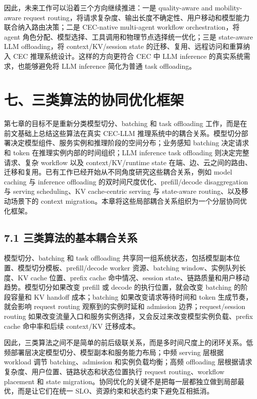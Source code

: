 \documentclass[a4paper,10pt]{ctexart}
\begin{document}
因此，未来工作可以沿着三个方向继续推进：一是 quality-aware and mobility-aware request routing，将请求复杂度、输出长度不确定性、用户移动和模型能力联合纳入路由决策；二是 CEC-native multi-agent workflow orchestration，将 agent 角色分配、模型选择、工具调用和物理节点选择统一优化；三是 state-aware LLM offloading，将 context/KV/session state 的迁移、复用、远程访问和重算纳入 CEC 推理系统设计。这样的方向更符合 CEC 中 LLM inference 的真实系统需求，也能够避免将 LLM inference 简化为普通 task offloading。




\section*{七、三类算法的协同优化框架}

第七章的目标不是重新分类模型切分、batching 和 task offloading 工作，而是在前文基础上总结这些算法在真实 CEC-LLM 推理系统中的耦合关系。模型切分部署决定模型组件、服务实例和推理阶段的空间分布；业务感知 batching 决定请求和 token 在推理实例内部的时间组织；LLM inference task offloading 则决定完整请求、复杂 workflow 以及 context/KV/runtime state 在端、边、云之间的路由、迁移和复用。已有工作已经开始从不同角度研究这些耦合关系，例如 model caching 与 inference offloading 的双时间尺度优化、prefill/decode disaggregation 与 serving scheduling、KV cache-centric serving 与 state-aware routing、以及移动场景下的 context migration。本章将这些局部耦合关系组织为一个分层协同优化框架。


\subsection*{7.1 三类算法的基本耦合关系}

模型切分、batching 和 task offloading 共享同一组系统状态，包括模型副本位置、模型切分模板、prefill/decode worker 资源、batching window、实例队列长度、KV cache 位置、prefix cache 命中情况、session state、链路质量和用户移动趋势。模型切分如果改变 prefill 或 decode 的执行位置，就会改变 batching 的阶段容量和 KV handoff 成本；batching 如果改变请求等待时间和 token 生成节奏，就会影响 request routing 观察到的实例时延和 admission 边界；request/session routing 如果改变流量入口和服务实例选择，又会反过来改变模型实例负载、prefix cache 命中率和后续 context/KV 迁移成本。


因此，三类算法之间不是简单的前后级联关系，而是多时间尺度上的闭环关系。低频部署层决定模型切分、模型副本和服务能力布局；中频 serving 层根据 workload 调节 batching、admission 和实例负载均衡；高频 offloading 层根据请求复杂度、用户位置、链路状态和状态位置执行 request routing、workflow placement 和 state migration。协同优化的关键不是把每一层都独立做到局部最优，而是让它们在统一 SLO、资源约束和状态约束下避免互相抵消。
\end{document}
